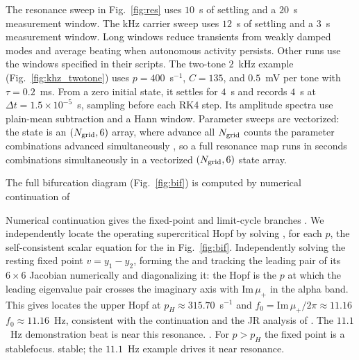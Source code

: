 \documentclass[11pt,a4paper]{article}
\providecommand{\DIFaddtex}[1]{{\protect\color{blue} \sf #1}} %
\providecommand{\DIFdeltex}[1]{{\protect\color{red} \scriptsize #1}} %
\providecommand{\DIFaddbegin}{} %
\providecommand{\DIFaddend}{} %
\providecommand{\DIFdelbegin}{} %
\providecommand{\DIFdelend}{} %
\providecommand{\DIFadd}[1]{\texorpdfstring{\DIFaddtex{#1}}{#1}} %
\providecommand{\DIFdel}[1]{\texorpdfstring{\DIFdeltex{#1}}{}} %
\begin{document}
The resonance sweep \DIFdelbegin \DIFdel{in Fig.~\ref{fig:res} }\DIFdelend uses $10$~s of settling and a $20$~s
measurement window. \DIFaddbegin \DIFadd{The kHz carrier sweep uses $12$~s of settling and
a $3$~s measurement window. }\DIFaddend Long windows reduce transients from weakly damped modes and
average beating when autonomous activity persists. Other runs use the windows
specified in their scripts.
The two-tone $2$~kHz example (Fig.~\ref{fig:khz_twotone}) uses $p=400$~s$^{-1}$,
$C=135$, and $0.5$~mV per tone with $\tau=0.2$~ms. From a zero initial state,
it settles for $4$~s and records $4$~s at $\Delta t=1.5\times10^{-5}$~s,
sampling before each RK4 step. Its amplitude spectra use plain-mean subtraction
and a Hann window. Parameter sweeps \DIFdelbegin \DIFdel{are vectorized: the state is an
$(N_{\rm grid},6)$ array, where }\DIFdelend \DIFaddbegin \DIFadd{advance all }\DIFaddend $N_{\rm grid}$ \DIFdelbegin \DIFdel{counts the parameter combinations advanced simultaneously
, so a full
resonance map runs in seconds}\DIFdelend \DIFaddbegin \DIFadd{combinations simultaneously
in a vectorized $(N_{\rm grid},6)$ state array}\DIFaddend .

\DIFdelbegin \DIFdel{The full bifurcation diagram (Fig.~\ref{fig:bif}) is computed by numerical continuation of
}\DIFdelend \DIFaddbegin \fi

\DIFadd{Numerical continuation gives }\DIFaddend the fixed-point and limit-cycle branches \DIFdelbegin \DIFdel{. We independently locate the operating
supercritical Hopf by solving , for each $p$, the self-consistent scalar equation for the
}\DIFdelend \DIFaddbegin \DIFadd{in
Fig.~\ref{fig:bif}. Independently solving the }\DIFaddend resting fixed point \DIFdelbegin \DIFdel{$v=y_1-y_2$, forming the }\DIFdelend \DIFaddbegin \DIFadd{and tracking
the leading pair of its }\DIFaddend $6\times6$ Jacobian \DIFdelbegin \DIFdel{numerically and
diagonalizing it: the Hopf is the $p$ at
which the leading eigenvalue pair crosses the
imaginary axis with $\mathrm{Im}\,\mu_+$ in the alpha band. This gives
}\DIFdelend \DIFaddbegin \DIFadd{locates the upper Hopf at
}\DIFaddend $p_H\approx315.70$~s$^{-1}$ and \DIFdelbegin \DIFdel{$f_0=\mathrm{Im}\,\mu_+/2\pi\approx11.16$}\DIFdelend \DIFaddbegin \DIFadd{$f_0\approx11.16$}\DIFaddend ~Hz, consistent with
\DIFdelbegin \DIFdel{the continuation and the JR analysis of \cite{grimbert2006}. The $11.1$~Hz demonstration beat is near this resonance. }\DIFdelend \DIFaddbegin \DIFadd{\cite{grimbert2006}. }\DIFaddend For $p>p_H$ the fixed point is \DIFdelbegin \DIFdel{a stablefocus.
}\DIFdelend \DIFaddbegin \DIFadd{stable; the $11.1$~Hz
example drives it near resonance.
}
\end{document}
